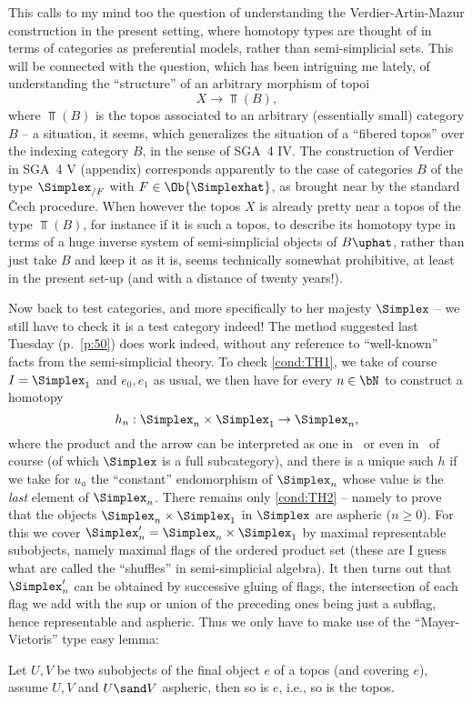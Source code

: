 This calls to my mind too the question of understanding the
Verdier-Artin-Mazur construction in the present setting, where
homotopy types are thought of in terms of categories as preferential
models, rather than semi-simplicial sets. This will be connected with
the question, which has been intriguing me lately, of
understanding the ``structure'' of an arbitrary morphism of topoi
\[ X\to\Top(B),\]
where $\Top(B)$ is the topos associated to an arbitrary (essentially
small) category $B$ -- a situation, it seems, which generalizes the
situation of a ``fibered topos'' over the indexing category $B$, in
the sense of SGA~4 IV. The construction of Verdier in SGA~4 V
(appendix) corresponds apparently to the case of categories $B$ of the
type $\Simplex_{/F}$ with $F\in\Ob{\Simplexhat}$, as brought near by
the standard \v Cech procedure. When however the topos $X$ is already
pretty near a topos of the type $\Top(B)$, for instance if it is such
a topos, to describe its homotopy type in terms of a huge inverse
system of semi-simplicial objects of $B\uphat$, rather than just
take $B$ and keep it as it is, seems technically somewhat prohibitive,
at least in the present set-up (and with a distance of twenty years!).

\label{sec:36}%
Now back to test categories, and more specifically to her majesty
$\Simplex$ -- we still have to check it is a test category indeed! The
method suggested last Tuesday
(p.~\ref{p:50}) does work indeed, without any
reference to ``well-known'' facts from the semi-simplicial theory. To
check \ref{cond:TH1}, we take of course $I=\Simplex_1$ and $e_0,e_1$ as
usual, we then have for every $n\in\bN$ to construct a homotopy
\[ h_n : \Simplex_n \times \Simplex_1 \to \Simplex_n,\]
where the product and the arrow can be interpreted as one in \Cat\ or
even in \Ord\ of course (of which $\Simplex$ is a full subcategory), and
there is a unique such $h$ if we take for $u_a$ the ``constant''
endomorphism of $\Simplex_n$ whose value is the \emph{last} element of
$\Simplex_n$. There remains only \ref{cond:TH2} -- namely to prove that
the objects $\Simplex_n\times\Simplex_1$ in $\Simplex$ are aspheric
($n\ge0$). For this we cover $\Simplex_n'=\Simplex_n\times\Simplex_1$ by
maximal representable subobjects, namely maximal flags of the ordered
product set (these are I guess what are called the ``shuffles'' in
semi-simplicial algebra). It then turns out that $\Simplex_n'$ can be
obtained by successive gluing of flags, the intersection of each flag
we add with the sup or union of the preceding ones being just a
subflag, hence representable and aspheric. Thus we only have to make
use of the ``Mayer-Vietoris'' type easy lemma:
\begin{lemma}
  Let $U,V$ be two subobjects of the final object $e$ of a topos (and covering $e$), assume
  $U,V$ and $U\sand V$ aspheric, then so is $e$, i.e., so is the topos.
\end{lemma}


